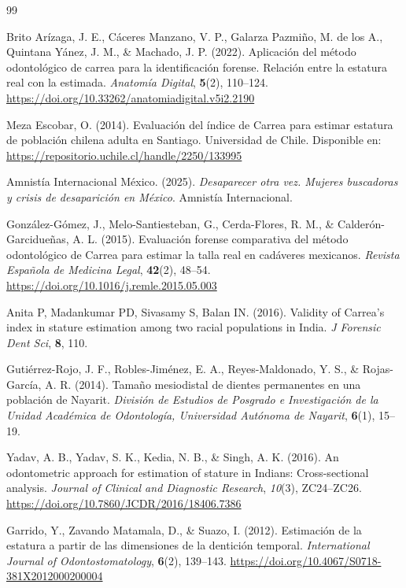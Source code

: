 \documentclass[11pt,letterpaper]{article}
\begin{document}
\begin{thebibliography}{99}

Brito Arízaga, J. E., Cáceres Manzano, V. P., Galarza Pazmiño, M. de los A., Quintana Yánez, J. M., \& Machado, J. P. (2022). Aplicación del método odontológico de carrea para la identificación forense. Relación entre la estatura real con la estimada. \textit{Anatomía Digital}, \textbf{5}(2), 110--124. \url{https://doi.org/10.33262/anatomiadigital.v5i2.2190}

Meza Escobar, O. (2014).
Evaluación del índice de Carrea para estimar estatura de población chilena adulta en Santiago.
Universidad de Chile. Disponible en: \url{https://repositorio.uchile.cl/handle/2250/133995}

Amnistía Internacional México. (2025). \textit{Desaparecer otra vez. Mujeres buscadoras y crisis de desaparición en México}. Amnistía Internacional.

González-Gómez, J., Melo-Santiesteban, G., Cerda-Flores, R. M., \& Calderón-Garcidueñas, A. L. (2015). Evaluación forense comparativa del método odontológico de Carrea para estimar la talla real en cadáveres mexicanos. \textit{Revista Española de Medicina Legal}, \textbf{42}(2), 48--54. \url{https://doi.org/10.1016/j.remle.2015.05.003}

Anita P, Madankumar PD, Sivasamy S, Balan IN. (2016). Validity of Carrea's index in stature estimation among two racial populations in India. \textit{J Forensic Dent Sci}, \textbf{8}, 110.

Gutiérrez-Rojo, J. F., Robles-Jiménez, E. A., Reyes-Maldonado, Y. S., \& Rojas-García, A. R. (2014). Tamaño mesiodistal de dientes permanentes en una población de Nayarit. \textit{División de Estudios de Posgrado e Investigación de la Unidad Académica de Odontología, Universidad Autónoma de Nayarit}, \textbf{6}(1), 15--19.

Yadav, A. B., Yadav, S. K., Kedia, N. B., \& Singh, A. K. (2016).
An odontometric approach for estimation of stature in Indians: Cross-sectional analysis.
\textit{Journal of Clinical and Diagnostic Research}, \textit{10}(3), ZC24--ZC26.
\url{https://doi.org/10.7860/JCDR/2016/18406.7386}

Garrido, Y., Zavando Matamala, D., \& Suazo, I. (2012). Estimación de la estatura a partir de las dimensiones de la dentición temporal. \textit{International Journal of Odontostomatology}, \textbf{6}(2), 139--143. \url{https://doi.org/10.4067/S0718-381X2012000200004}

\end{thebibliography}
\end{document}
